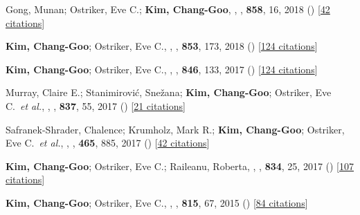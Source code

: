 \item[{15.}]Gong, Munan; Ostriker, Eve C.; \textbf{Kim, Chang-Goo}, , \apj, \textbf{858}, 16, 2018 () [\href{http://adsabs.harvard.edu/abs/2018ApJ...858...16G}{42 citations}]

\item[{14.}]\textbf{Kim, Chang-Goo}; Ostriker, Eve C., , \apj, \textbf{853}, 173, 2018 () [\href{http://adsabs.harvard.edu/abs/2018ApJ...853..173K}{124 citations}]

\item[{13.}]\textbf{Kim, Chang-Goo}; Ostriker, Eve C., , \apj, \textbf{846}, 133, 2017 () [\href{http://adsabs.harvard.edu/abs/2017ApJ...846..133K}{124 citations}]

\item[{12.}]Murray, Claire E.; Stanimirovi{\'c}, Sne{\v{z}}ana; \textbf{Kim, Chang-Goo}; Ostriker, Eve C.~\textit{et al.}, , \apj, \textbf{837}, 55, 2017 () [\href{http://adsabs.harvard.edu/abs/2017ApJ...837...55M}{21 citations}]

\item[{11.}]Safranek-Shrader, Chalence; Krumholz, Mark R.; \textbf{Kim, Chang-Goo}; Ostriker, Eve C.~\textit{et al.}, , \mnras, \textbf{465}, 885, 2017 () [\href{http://adsabs.harvard.edu/abs/2017MNRAS.465..885S}{42 citations}]

\item[{10.}]\textbf{Kim, Chang-Goo}; Ostriker, Eve C.; Raileanu, Roberta, , \apj, \textbf{834}, 25, 2017 () [\href{http://adsabs.harvard.edu/abs/2017ApJ...834...25K}{107 citations}]

\item[{9.}]\textbf{Kim, Chang-Goo}; Ostriker, Eve C., , \apj, \textbf{815}, 67, 2015 () [\href{http://adsabs.harvard.edu/abs/2015ApJ...815...67K}{84 citations}]

